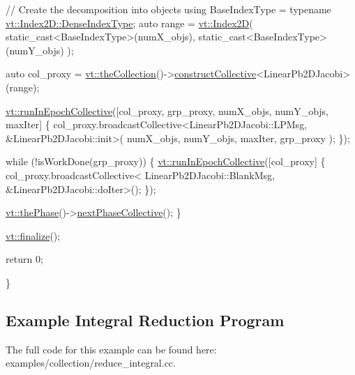 \begin{DoxyCodeInclude}
  \textcolor{comment}{// Create the decomposition into objects}
  \textcolor{keyword}{using} BaseIndexType = \textcolor{keyword}{typename} \hyperlink{structvt_1_1index_1_1_dense_index_array_a36698427e28045290d1fb072573275ec}{vt::Index2D::DenseIndexType};
  \textcolor{keyword}{auto} range = \hyperlink{namespacevt_a3bab786053b74a3d856fff1412ffa73a}{vt::Index2D}(
    static\_cast<BaseIndexType>(numX\_objs),
    static\_cast<BaseIndexType>(numY\_objs)
  );

  \textcolor{keyword}{auto} col\_proxy =
    \hyperlink{namespacevt_a1c45ce63bfd2c327ff7d76a319a371d8}{vt::theCollection}()->\hyperlink{structvt_1_1vrt_1_1collection_1_1_collection_manager_aa2531212565b2c6f85fa3b55d278bbba}{constructCollective}<LinearPb2DJacobi>(range);

  \hyperlink{namespacevt_a2fc4ef34f30b49a1781d765804bfadbb}{vt::runInEpochCollective}([col\_proxy, grp\_proxy, numX\_objs, numY\_objs, maxIter] \{
    col\_proxy.broadcastCollective<LinearPb2DJacobi::LPMsg, &LinearPb2DJacobi::init>(
      numX\_objs, numY\_objs, maxIter, grp\_proxy
    );
  \});

  \textcolor{keywordflow}{while} (!isWorkDone(grp\_proxy)) \{
    \hyperlink{namespacevt_a2fc4ef34f30b49a1781d765804bfadbb}{vt::runInEpochCollective}([col\_proxy] \{
      col\_proxy.broadcastCollective<
        LinearPb2DJacobi::BlankMsg, &LinearPb2DJacobi::doIter>();
    \});

    \hyperlink{namespacevt_a3799d6b51fb71d7b6505760aad457e61}{vt::thePhase}()->\hyperlink{structvt_1_1phase_1_1_phase_manager_ac94bfde4a103cbdec426542191c41092}{nextPhaseCollective}();
  \}

  \hyperlink{namespacevt_a540d90dbd6e97b69f1dcbc9ee9314cff}{vt::finalize}();

  \textcolor{keywordflow}{return} 0;

\}
\end{DoxyCodeInclude}
\hypertarget{reduce-integral-example}{}\subsection{Example Integral Reduction Program}\label{reduce-integral-example}
The full code for this example can be found here\+: {\ttfamily examples/collection/reduce\+\_\+integral.\+cc}.


